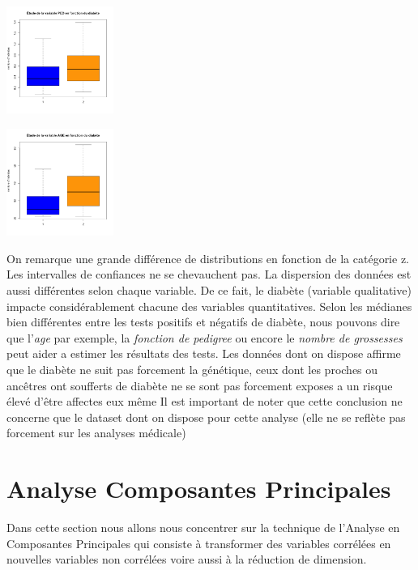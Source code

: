 \documentclass[10pt]{article}
\begin{document}
\begin{center}
\begin{minipage}[t]{0.3\textwidth}
	\end{minipage}
	\newline
	\begin{minipage}[t]{0.3\textwidth}
		\includegraphics[width=35mm]{Figures/Pima/bxp_z_ped.png}
	\end{minipage}
	\begin{minipage}[t]{0.3\textwidth}
		\includegraphics[width=35mm]{Figures/Pima/bxp_z_age.png}
	\end{minipage}
\end{center}

On remarque une grande différence de distributions en fonction de la catégorie z. Les intervalles de confiances ne se chevauchent pas. La dispersion des données est aussi différentes selon chaque variable. De ce fait, le diabète (variable  qualitative) impacte considérablement chacune des variables quantitatives. 
Selon les médianes bien différentes entre les tests positifs et négatifs de diabète, nous pouvons dire que l'\textit{age} par exemple, la \textit{fonction de pedigree} ou encore le \textit{nombre de grossesses} peut aider a estimer les résultats des tests.
Les données dont on dispose affirme que le diabète ne suit pas forcement la génétique, ceux dont les proches ou ancêtres ont soufferts de diabète ne se sont pas forcement exposes a un risque élevé d'être affectes eux même Il est important de noter que cette conclusion ne concerne que le dataset dont on dispose pour cette analyse (elle ne se reflète pas forcement sur les analyses médicale)
	
	\section{Analyse Composantes Principales}
	Dans cette section nous allons nous concentrer sur la technique de l’Analyse en Composantes Principales qui consiste à transformer des variables corrélées en nouvelles variables non corrélées voire aussi à la réduction de dimension.
\end{document}
